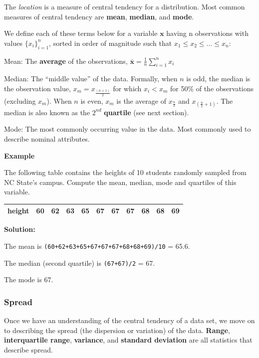 \documentclass[
  letterpaper,
  DIV=11,
  numbers=noendperiod]{scrreprt}
\begin{document}
The \emph{location} is a measure of central tendency for a distribution.
Most common measures of central tendency are \textbf{mean},
\textbf{median}, and \textbf{mode}.

We define each of these terms below for a variable \(\mathbf{x}\) having
n observations with values \(\{x_i\}_{i=1}^n\), sorted in order of
magnitude such that \(x_1 \leq x_2 \leq \dots \leq x_n\):

Mean: The \textbf{average} of the observations,
\(\bar{\mathbf{x}}= \frac{1}{n}\sum_{i=1}^n x_i\)

Median: The ``middle value'' of the data. Formally, when \(n\) is odd,
the median is the observation value, \(x_m = x_{\frac{(n+1)}{2}}\) for
which \(x_i < x_m\) for 50\% of the observations (excluding \(x_m\)).
When \(n\) is even, \(x_m\) is the average of \(x_\frac{n}{2}\) and
\(x_{(\frac{n}{2}+1)}\). The median is also known as the \(2^{nd}\)
\textbf{quartile} (see next section).

Mode: The most commonly occurring value in the data. Most commonly used
to describe nominal attributes.

\textbf{Example}

The following table contains the heights of 10 students randomly sampled
from NC State's campus. Compute the mean, median, mode and quartiles of
this variable.

\begin{longtable}[]{@{}ccccccccccc@{}}
\toprule()
\endhead
height & 60 & 62 & 63 & 65 & 67 & 67 & 67 & 68 & 68 & 69 \\
\bottomrule()
\end{longtable}

\textbf{Solution:}

The mean is \texttt{(60+62+63+65+67+67+67+68+68+69)/10} = 65.6.

The median (second quartile) is \texttt{(67+67)/2} = 67.

The mode is 67.

\hypertarget{spread}{%
\subsubsection*{Spread}\label{spread}}

Once we have an understanding of the central tendency of a data set, we
move on to describing the spread (the dispersion or variation) of the
data. \textbf{Range}, \textbf{interquartile range}, \textbf{variance},
and \textbf{standard deviation} are all statistics that describe spread.
\end{document}
